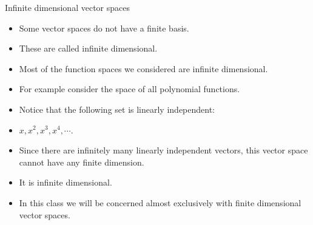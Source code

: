 \documentclass{beamer}
\begin{document}
\begin{frame}{Infinite dimensional vector spaces}

\begin{itemize}
\item Some vector spaces do not have a finite basis.
\item These are called infinite dimensional.
\item Most of the function spaces we considered are infinite dimensional.
\item For example consider the space of all polynomial functions.
\item Notice that the following set is linearly independent:
\item $x, x^2, x^3, x^4, \cdots$.
\item Since there are infinitely many linearly independent vectors, this vector space cannot have any finite dimension.
\item It is infinite dimensional.
\item In this class we will be concerned almost exclusively with finite dimensional vector spaces.
\end{itemize}

\end{frame}
\end{document}

